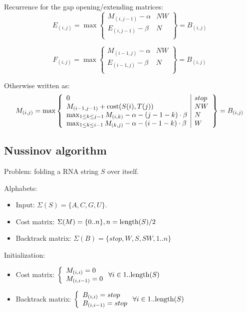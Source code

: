 \documentclass[11pt]{article}
\def\ul{\begin{itemize}}
\def\ule{\end{itemize}}
\begin{document}
Recurrence for the gap opening/extending matrices:
\[E_{(i,j)}=\max\left\{\begin{array}{l|l}
	M_{(i, j-1)} - \alpha & NW\\
	E_{(i,j-1)} - \beta & N\\
\end{array}\right\}=B_{(i,j)} \]

\[F_{(i,j)}=\max\left\{\begin{array}{l|l}
	M_{(i-1, j)} - \alpha & NW\\
	E_{(i-1,j)} - \beta & N\\
\end{array}\right\}=B_{(i,j)} \]


Otherwise written as:
\[M_{(i,j)}=\max\left\{\begin{array}{l|l}
	0 & stop\\
	M_{(i-1,j-1)}+{\rm cost}(S(i),T(j)) & NW\\
	\max_{1 \le k \le j-1} M_{(i,k)} - \alpha - (j-1-k) \cdot \beta & N\\
	\max_{1 \le k \le i-1} M_{(k,j)} - \alpha - (i-1-k) \cdot \beta & W\\
\end{array}\right\}=B_{(i,j)} \]





\newpage
\subsection{Nussinov algorithm}
Problem: folding a RNA string $S$ over itself.

Alphabets:\ul
\item Input: $\Sigma(S)=\{A,C,G,U\}$.
\item Cost matrix: $\Sigma(M)=\{0..n\}, n={\rm length}(S)/2$
\item Backtrack matrix: $\Sigma(B)=\{stop,W,S,SW, 1..n\}$
\ule

Initialization: \ul
\item Cost matrix: $\left\{\begin{array}{l} M_{(i,i)}=0 \\ M_{(i,i-1)}=0 \end{array}\right. \forall i \in 1..{\rm length}(S)$
\item Backtrack matrix: $\left\{\begin{array}{l} B_{(i,i)}=stop \\ B_{(i,i-1)}=stop \end{array}\right.  \forall i \in 1..{\rm length}(S)$
\ule
\end{document}
